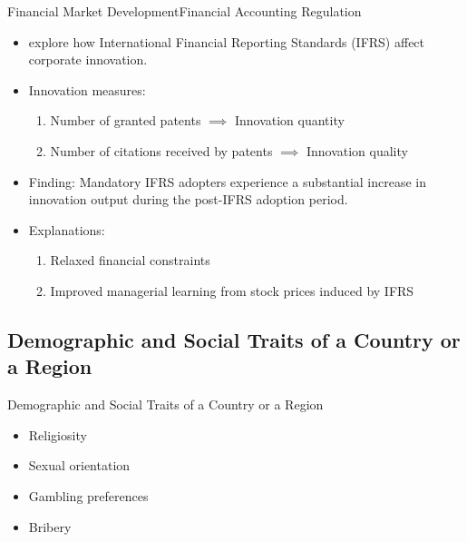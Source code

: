 \documentclass{beamer}
\begin{document}
    \begin{frame}{Financial Market Development}{Financial Accounting Regulation}
        \vspace{-1cm}
        \begin{itemize}
            \item \citet{LTMZ2016RealEffectFinancial} explore how International Financial Reporting Standards (IFRS) affect corporate innovation.
            \item Innovation measures:
            \begin{enumerate}
                \item Number of granted patents $\implies$ Innovation quantity
                \item Number of citations received by patents $\implies$ Innovation quality
            \end{enumerate}
            \item Finding: Mandatory IFRS adopters experience a substantial increase in innovation output during the post-IFRS adoption period.
            \item Explanations: 
            \begin{enumerate}
                \item Relaxed financial constraints
                \item Improved managerial learning from stock prices induced by IFRS
            \end{enumerate}
        \end{itemize}
    \end{frame}

    \subsection{Demographic and Social Traits of a Country or a Region}

    \begin{frame}{Demographic and Social Traits of a Country or a Region}
        \vspace{-1cm}
        \begin{itemize}
            \item Religiosity
            \item Sexual orientation
            \item Gambling preferences
            \item Bribery
        \end{itemize}
    \end{frame}
\end{document}
